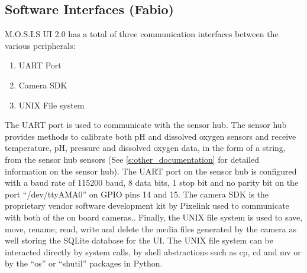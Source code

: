\subsection{Software Interfaces (Fabio)}
M.O.S.I.S UI 2.0 has a total of three communication interfaces between the various peripherals:
\begin{enumerate}
\item UART Port
\item Camera SDK
\item UNIX File system
\end{enumerate}
The UART port is used to communicate with the sensor hub. The sensor hub provides methods to calibrate both pH and dissolved oxygen sensors and receive temperature, pH, pressure and dissolved oxygen data, in the form of a string, from the sensor hub sensors (See \ref{s:other_documentation} for detailed information on the sensor hub). The UART port on the sensor hub is configured with a baud rate of 115200 baud, 8 data bits, 1 stop bit and no parity bit on the port ``/dev/ttyAMA0'' on GPIO pins 14 and 15.\cite{UARTRaspberryPi} The camera SDK is the proprietary vendor software development kit by Pixelink used to communicate with both of the on board cameras.\cite{WhatFunctionsFeatures}. Finally, the UNIX file system is used to save, move, rename, read, write and delete the media files generated by the camera as well storing the SQLite database for the UI. The UNIX file system can be interacted directly by system calls, by shell abstractions such as cp, cd and mv or by the ``os'' or ``shutil'' packages in Python.\cite{SystemCallsUnix}\cite{UnixShellSummary}\cite{OsMiscellaneousOperating}\cite{ShutilHighlevelFile}

